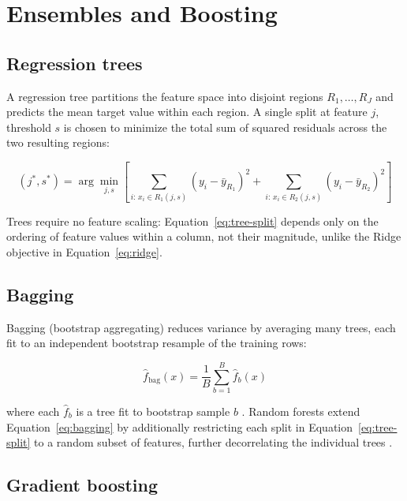 \section{Ensembles and Boosting}
\label{sec:ensembles}

\subsection{Regression trees}

A regression tree partitions the feature space into disjoint regions
$R_1,\dots,R_J$ and predicts the mean target value within each region. A
single split at feature $j$, threshold $s$ is chosen to minimize the total
sum of squared residuals across the two resulting regions:

\begin{equation}
\label{eq:tree-split}
(j^*, s^*) = \arg\min_{j,s}
\left[
  \sum_{i:\, x_i \in R_1(j,s)} \left(y_i - \bar y_{R_1}\right)^2
  +
  \sum_{i:\, x_i \in R_2(j,s)} \left(y_i - \bar y_{R_2}\right)^2
\right]
\end{equation}

Trees require no feature scaling: Equation~\ref{eq:tree-split} depends
only on the ordering of feature values within a column, not their
magnitude, unlike the Ridge objective in Equation~\ref{eq:ridge}.

\subsection{Bagging}

Bagging (bootstrap aggregating) reduces variance by averaging many trees,
each fit to an independent bootstrap resample of the training rows:

\begin{equation}
\label{eq:bagging}
\hat f_{\mathrm{bag}}(x) = \frac{1}{B}\sum_{b=1}^{B} \hat f_b(x)
\end{equation}

where each $\hat f_b$ is a tree fit to bootstrap sample $b$
\cite{breiman1996bagging}. Random forests extend
Equation~\ref{eq:bagging} by additionally restricting each split in
Equation~\ref{eq:tree-split} to a random subset of features, further
decorrelating the individual trees \cite{breiman2001random}.

\subsection{Gradient boosting}

